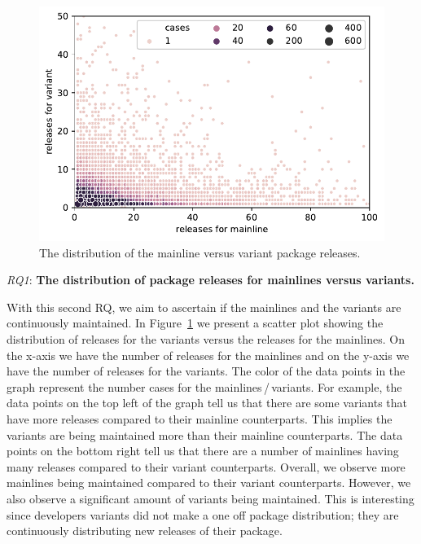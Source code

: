 \begin{figure}[htbp]
\vspace{-.3cm}
   \centering
    \includegraphics[scale=0.6]{figures/benevolj_releases.pdf}
    \caption{The distribution of the mainline versus variant package releases.}
    \label{fig:releases}
\end{figure}

\textit{RQ1}: \textbf{The distribution of package releases for mainlines versus variants.}

With this second RQ, we aim to ascertain if the mainlines and the variants are continuously maintained. 
In Figure~\ref{fig:releases} we present a scatter plot showing the distribution of releases for the variants versus the releases for the mainlines. 
On the x-axis we have the number of releases for the mainlines and on the y-axis we have the number of releases for the variants. 
The color of the data points in the graph represent the number cases for the mainlines\,/\,variants. 
For example, the data points on the top left of the graph tell us that there are some variants that have more releases compared to their mainline counterparts. 
This implies the variants are being maintained more than their mainline counterparts.
The data points on the bottom right tell us that there are a number of mainlines having many releases compared to their variant counterparts. 
Overall, we observe more mainlines being maintained compared to their variant counterparts.
However, we also observe a significant amount of variants being maintained. 
This is interesting since developers variants did not make a one off package distribution; they are continuously distributing new releases of their package. 

